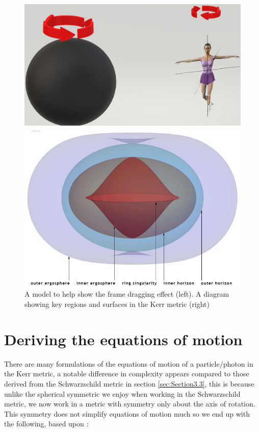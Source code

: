 \documentclass[oneside,openright,frontopenright, singlespacing]{dmathesis}
\begin{document}
\vspace{1em}
\begin{figure}[!ht]
	\centering
	\begin{minipage}{0.5\textwidth}
		\centering
		\includegraphics[width=0.8\linewidth]{img/addison-wesley}
	\end{minipage}%
	\hfill
	\begin{minipage}{0.5\textwidth}
		\centering
		\includegraphics[width=0.8\linewidth]{img/Kerr-surfaces}
	\end{minipage}
	\caption{A model to help show the frame dragging effect (left). A diagram showing key regions and surfaces in the Kerr metric \cite{yukterezkerrnewman} (right)}
	\label{fig:Figure4.1}
\end{figure}

\section{Deriving the equations of motion}\label{sec:Section4.5}

	There are many formulations of the equations of motion of a particle/photon in the Kerr metric, a notable difference in complexity appears compared to those derived from the Schwarzschild metric in section \ref{sec:Section3.3}, this is because unlike the spherical symmetric we enjoy when working in the Schwarzschild metric, we now work in a metric with symmetry only about the axis of rotation. This symmetry does not simplify equations of motion much so we end up with the following, based upon \cite{yukterezKerr}:
\end{document}
